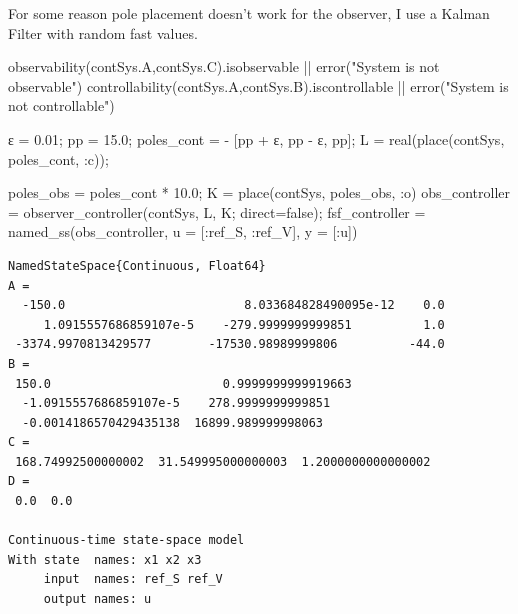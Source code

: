 \documentclass[
  8pt,
  a4paper,
]{book}
\newenvironment{Shaded}{\begin{snugshade}}{\end{snugshade}}
\newcommand{\ConstantTok}[1]{\textcolor[rgb]{0.56,0.35,0.01}{#1}}
\newcommand{\FloatTok}[1]{\textcolor[rgb]{0.68,0.00,0.00}{#1}}
\newcommand{\FunctionTok}[1]{\textcolor[rgb]{0.28,0.35,0.67}{#1}}
\newcommand{\NormalTok}[1]{\textcolor[rgb]{0.00,0.23,0.31}{#1}}
\newcommand{\OperatorTok}[1]{\textcolor[rgb]{0.37,0.37,0.37}{#1}}
\newcommand{\StringTok}[1]{\textcolor[rgb]{0.13,0.47,0.30}{#1}}
\begin{document}
For some reason pole placement doesn't work for the observer, I use a
Kalman Filter with random fast values.

\begin{Shaded}
\begin{Highlighting}[]
\FunctionTok{observability}\NormalTok{(contSys.A,contSys.C).isobservable }\OperatorTok{||} \FunctionTok{error}\NormalTok{(}\StringTok{"System is not observable"}\NormalTok{)}
\FunctionTok{controllability}\NormalTok{(contSys.A,contSys.B).iscontrollable }\OperatorTok{||} \FunctionTok{error}\NormalTok{(}\StringTok{"System is not controllable"}\NormalTok{)}

\NormalTok{ε }\OperatorTok{=} \FloatTok{0.01}\NormalTok{;}
\NormalTok{pp }\OperatorTok{=} \FloatTok{15.0}\NormalTok{;}
\NormalTok{poles\_cont }\OperatorTok{=} \OperatorTok{{-}}\NormalTok{ [pp }\OperatorTok{+}\NormalTok{ ε, pp }\OperatorTok{{-}}\NormalTok{ ε, pp];}
\NormalTok{L }\OperatorTok{=} \FunctionTok{real}\NormalTok{(}\FunctionTok{place}\NormalTok{(contSys, poles\_cont, }\OperatorTok{:}\NormalTok{c));}


\NormalTok{poles\_obs }\OperatorTok{=}\NormalTok{ poles\_cont }\OperatorTok{*} \FloatTok{10.0}\NormalTok{;}
\NormalTok{K }\OperatorTok{=} \FunctionTok{place}\NormalTok{(contSys, poles\_obs, }\OperatorTok{:}\NormalTok{o)}
\NormalTok{obs\_controller }\OperatorTok{=} \FunctionTok{observer\_controller}\NormalTok{(contSys, L, K; direct}\OperatorTok{=}\ConstantTok{false}\NormalTok{);}
\NormalTok{fsf\_controller }\OperatorTok{=} \FunctionTok{named\_ss}\NormalTok{(obs\_controller, u }\OperatorTok{=}\NormalTok{ [}\OperatorTok{:}\NormalTok{ref\_S, }\OperatorTok{:}\NormalTok{ref\_V], y }\OperatorTok{=}\NormalTok{ [}\OperatorTok{:}\NormalTok{u])}
\end{Highlighting}
\end{Shaded}

\begin{verbatim}
NamedStateSpace{Continuous, Float64}
A = 
  -150.0                         8.033684828490095e-12    0.0
     1.0915557686859107e-5    -279.9999999999851          1.0
 -3374.9970813429577        -17530.98989999806          -44.0
B = 
 150.0                        0.9999999999919663
  -1.0915557686859107e-5    278.9999999999851
  -0.0014186570429435138  16899.989999998063
C = 
 168.74992500000002  31.549995000000003  1.2000000000000002
D = 
 0.0  0.0

Continuous-time state-space model
With state  names: x1 x2 x3
     input  names: ref_S ref_V
     output names: u
\end{verbatim}
\end{document}
